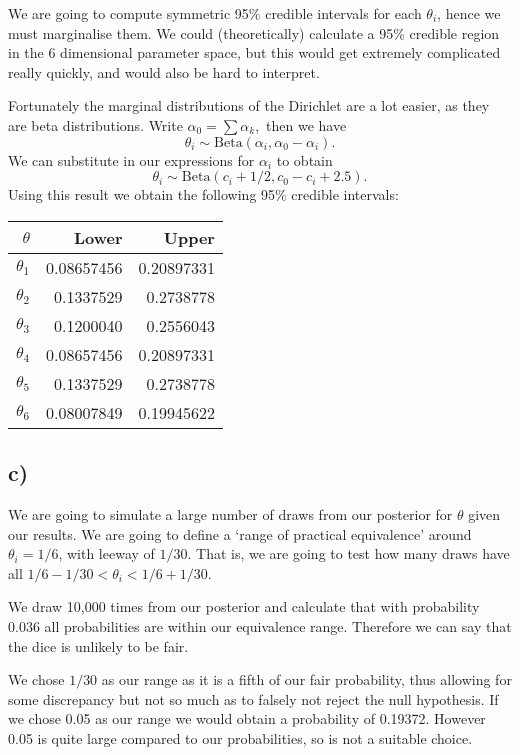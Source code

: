\documentclass[12pt]{extarticle}
\begin{document}
We are going to compute symmetric 95\% credible intervals for each $\theta_i$, hence we must marginalise them. We could (theoretically) calculate a 95\% credible region in the 6 dimensional parameter space, but this would get extremely complicated really quickly, and would also be hard to interpret. 

Fortunately the marginal distributions of the Dirichlet are a lot easier, as they are beta distributions. Write $\alpha_0 = \sum\alpha_k,$ then we have 
$$\theta_i \sim \mathrm{Beta}\left(\alpha_i, \alpha_0 - \alpha_i\right).$$ We can substitute in our expressions for $\alpha_i$ to obtain $$\theta_i \sim \mathrm{Beta}\left(c_i + 1/2, c_0 - c_i + 2.5\right).$$ Using this result we obtain the following 95\% credible intervals:


\begin{table}[H]
	\centering
	\begin{tabular}{r|rr}
		\hline
		$\theta$ & Lower & Upper\\
		\hline
		$\theta_1$ & 0.08657456 &0.20897331\\
		$\theta_2$ &0.1337529 &0.2738778\\
		$\theta_3$ &0.1200040 &0.2556043\\
		$\theta_4$ &0.08657456 &0.20897331\\
		$\theta_5$ &0.1337529 &0.2738778\\
		$\theta_6$ &0.08007849 &0.19945622\\
	\end{tabular}
\end{table}

\subsection*{c)}
We are going to simulate a large number of draws from our posterior for $\theta$ given our results. We are going to define a `range of practical equivalence' around $\theta_i = 1/6$, with leeway of $1/30$. That is, we are going to test how many draws have all $1/6 -1/30 < \theta_i < 1/6+1/30.$ 

We draw 10,000 times from our posterior and calculate that with probability $0.036$ all probabilities are within our equivalence range. Therefore we can say that the dice is unlikely to be fair. 

We chose $1/30$ as our range as it is a fifth of our fair probability, thus allowing for some discrepancy but not so much as to falsely not reject the null hypothesis. If we chose 0.05 as our range we would obtain a probability of 0.19372. However 0.05 is quite large compared to our probabilities, so is not a suitable choice.
\end{document}
